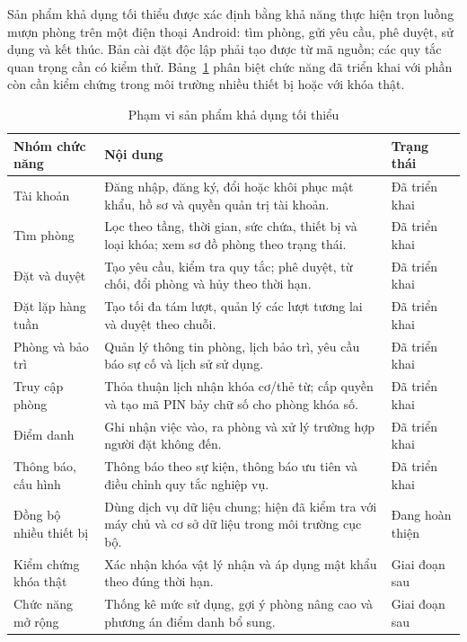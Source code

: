 Sản phẩm khả dụng tối thiểu được xác định bằng khả năng thực hiện trọn luồng mượn phòng trên một điện thoại Android: tìm phòng, gửi yêu cầu, phê duyệt, sử dụng và kết thúc. Bản cài đặt độc lập phải tạo được từ mã nguồn; các quy tắc quan trọng cần có kiểm thử. Bảng~\ref{tab:mvp} phân biệt chức năng đã triển khai với phần còn cần kiểm chứng trong môi trường nhiều thiết bị hoặc với khóa thật.

\begin{table}[H]
\centering
\caption{Phạm vi sản phẩm khả dụng tối thiểu}
\label{tab:mvp}
\small
\begin{tabularx}{\textwidth}{>{\raggedright\arraybackslash}p{3.4cm} X >{\centering\arraybackslash}p{1.9cm}}
\toprule
\rowcolor{RoomHubLight}
\textbf{Nhóm chức năng} & \textbf{Nội dung} & \textbf{Trạng thái} \\
\midrule
Tài khoản & Đăng nhập, đăng ký, đổi hoặc khôi phục mật khẩu, hồ sơ và quyền quản trị tài khoản. & Đã triển khai \\
Tìm phòng & Lọc theo tầng, thời gian, sức chứa, thiết bị và loại khóa; xem sơ đồ phòng theo trạng thái. & Đã triển khai \\
Đặt và duyệt & Tạo yêu cầu, kiểm tra quy tắc; phê duyệt, từ chối, đổi phòng và hủy theo thời hạn. & Đã triển khai \\
Đặt lặp hàng tuần & Tạo tối đa tám lượt, quản lý các lượt tương lai và duyệt theo chuỗi. & Đã triển khai \\
Phòng và bảo trì & Quản lý thông tin phòng, lịch bảo trì, yêu cầu báo sự cố và lịch sử sử dụng. & Đã triển khai \\
Truy cập phòng & Thỏa thuận lịch nhận khóa cơ/thẻ từ; cấp quyền và tạo mã PIN bảy chữ số cho phòng khóa số. & Đã triển khai \\
Điểm danh & Ghi nhận việc vào, ra phòng và xử lý trường hợp người đặt không đến. & Đã triển khai \\
Thông báo, cấu hình & Thông báo theo sự kiện, thông báo ưu tiên và điều chỉnh quy tắc nghiệp vụ. & Đã triển khai \\
\midrule
Đồng bộ nhiều thiết bị & Dùng dịch vụ dữ liệu chung; hiện đã kiểm tra với máy chủ và cơ sở dữ liệu trong môi trường cục bộ. & Đang hoàn thiện \\
Kiểm chứng khóa thật & Xác nhận khóa vật lý nhận và áp dụng mật khẩu theo đúng thời hạn. & Giai đoạn sau \\
Chức năng mở rộng & Thống kê mức sử dụng, gợi ý phòng nâng cao và phương án điểm danh bổ sung. & Giai đoạn sau \\
\bottomrule
\end{tabularx}
\end{table}

